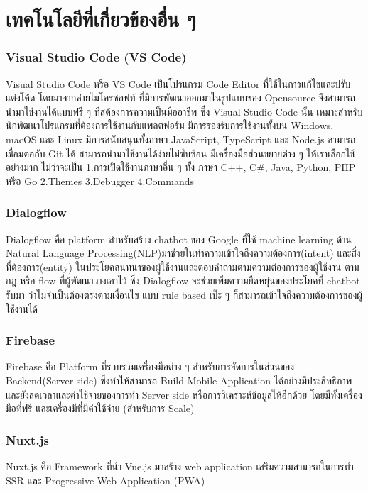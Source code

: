 \section{เทคโนโลยีที่เกี่ยวข้องอื่น ๆ}

\subsubsection{Visual Studio Code (VS Code)}
\quad Visual Studio Code หรือ VS Code เป็นโปรแกรม Code Editor ที่ใช้ในการแก้ไขและปรับแต่งโค้ด โดยมาจากค่ายไมโครซอฟท์ ที่มีการพัฒนาออกมาในรูปแบบของ Opensource จึงสามารถนำมาใช้งานได้แบบฟรี ๆ ทีสต้องการความเป็นมืออาชีพ ซึ่ง Visual Studio Code นั้น เหมาะสำหรับนักพัฒนาโปรแกรมที่ต้องการใช้งานกับแพลตฟอร์ม มีการรองรับการใช้งานทั้งบน Windows, macOS และ Linux มีการสนับสนุนทั้งภาษา  JavaScript, TypeScript และ Node.js สามารถเชื่อมต่อกับ  Git ได้ สามารถนำมาใช้งานได้ง่ายไม่ซับซ้อน มีเครื่องมือส่วนขยายต่าง ๆ ให้เราเลือกใช้อย่างมาก ไม่ว่าจะเป็น 1.การเปิดใช้งานภาษาอื่น ๆ ทั้ง ภาษา  C++,  C\#, Java, Python, PHP หรือ Go  2.Themes 3.Debugger 4.Commands 

\subsubsection{Dialogflow} 
\quad Dialogflow คือ platform สำหรับสร้าง chatbot ของ Google ที่ใช้ machine learning ด้าน Natural Language Processing(NLP)มาช่วยในทำความเข้าใจถึงความต้องการ(intent) และสิ่งที่ต้องการ(entity) ในประโยคสนทนาของผู้ใช้งานและตอบคำถามตามความต้องการของผู้ใช้งาน ตามกฎ หรือ flow ที่ผู้พัฒนาวางเอาไว้ ซึ่ง Dialogflow จะช่วยเพิ่มความยืดหยุ่นของประโยคที่ chatbot รับมา ว่าไม่จำเป็นต้องตรงตามเงื่อนไข แบบ rule based เป๊ะ ๆ ก็สามารถเข้าใจถึงความต้องการของผู้ใช้งานได้ 

\subsubsection{Firebase} 
\quad Firebase คือ Platform ที่รวบรวมเครื่องมือต่าง ๆ สำหรับการจัดการในส่วนของ Backend(Server side) ซึ่งทำให้สามารถ Build Mobile Application ได้อย่างมีประสิทธิภาพ และยังลดเวลาและค่าใช้จ่ายของการทำ Server side หรือการวิเคราะห์ข้อมูลให้อีกด้วย โดยมีทั้งเครื่องมือที่ฟรี และเครื่องมีที่มีค่าใช้จ่าย (สำหรับการ Scale) 

\subsubsection{Nuxt.js }
\quad Nuxt.js คือ Framework ที่นำ Vue.js มาสร้าง web application เสริมความสามารถในการทำ SSR และ Progressive Web Application (PWA) 


